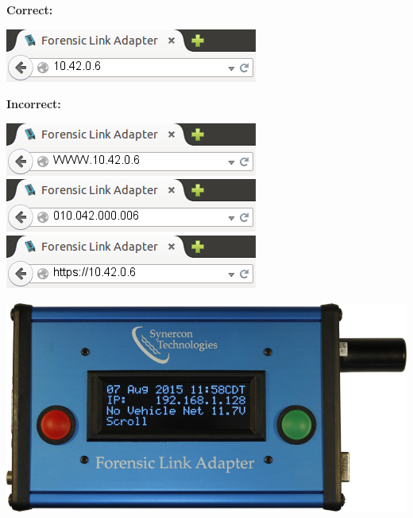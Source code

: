 \documentclass[11pt, oneside]{book}
\begin{document}
\noindent\begin{minipage}{0.45\textwidth}%
\begin{center}
\textbf{Correct:}\\[\baselineskip]
\end{center}
\includegraphics[width=\linewidth]{../media/fla_preview_screenshots/url_correct}
\begin{center}
\textbf{Incorrect:}\\[\baselineskip]
\end{center}
\includegraphics[width=\linewidth]{../media/fla_preview_screenshots/url_wrong_1}
\\[0.5\baselineskip]
\includegraphics[width=\linewidth]{../media/fla_preview_screenshots/url_wrong_2}
\\[0.5\baselineskip]
\includegraphics[width=\linewidth]{../media/fla_preview_screenshots/url_wrong_3}
\end{minipage}%
\hfill%
\begin{minipage}{0.45\textwidth}
\includegraphics[width=\linewidth]{../media/fla_screens/ethernet_and_others/main/title_no_net}
\end{minipage}
\end{document}
